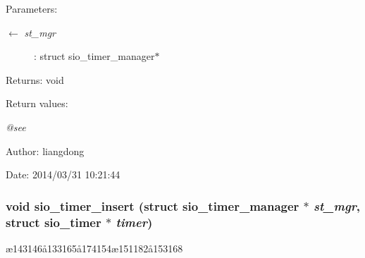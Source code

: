\begin{Desc}
\item[Parameters:]
\begin{description}
\item[\mbox{$\leftarrow$} {\em st\_\-mgr}]: struct sio\_\-timer\_\-manager$\ast$ \end{description}
\end{Desc}
\begin{Desc}
\item[Returns:]void \end{Desc}
\begin{Desc}
\item[Return values:]
\begin{description}
\item[{\em @see}]\end{description}
\end{Desc}
\begin{Desc}
\item[Author:]liangdong \end{Desc}
\begin{Desc}
\item[Date:]2014/03/31 10:21:44 \end{Desc}
\subsubsection{\setlength{\rightskip}{0pt plus 5cm}void sio\_\-timer\_\-insert (struct sio\_\-timer\_\-manager $\ast$ {\em st\_\-mgr}, struct sio\_\-timer $\ast$ {\em timer})}\label{sio__timer_8h_a4}


\ae{}143146\aa{}133165\aa{}174154\ae{}151182\aa{}153168 

